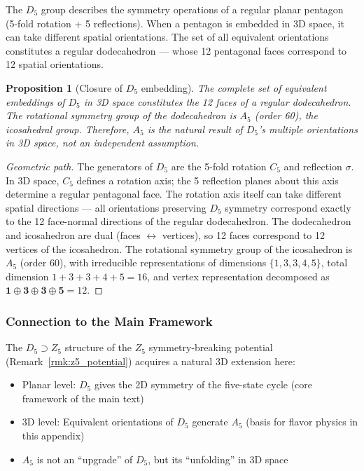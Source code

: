 \documentclass[12pt,a4paper,twocolumn]{article}
\newtheorem{proposition}[theorem]{Proposition}
\begin{document}
The $D_5$ group describes the symmetry operations of a regular planar pentagon (5-fold rotation + 5 reflections). When a pentagon is embedded in 3D space, it can take different spatial orientations. The set of all equivalent orientations constitutes a regular dodecahedron --- whose 12 pentagonal faces correspond to 12 spatial orientations.

\begin{proposition}[Closure of $D_5$ embedding]
\label{prop:d5_embed}
The complete set of equivalent embeddings of $D_5$ in 3D space constitutes the 12 faces of a regular dodecahedron. The rotational symmetry group of the dodecahedron is $A_5$ (order 60), the icosahedral group. Therefore, $A_5$ is the natural result of $D_5$'s multiple orientations in 3D space, not an independent assumption.
\end{proposition}

\begin{proof}[Geometric path]
The generators of $D_5$ are the 5-fold rotation $C_5$ and reflection $\sigma$. In 3D space, $C_5$ defines a rotation axis; the 5 reflection planes about this axis determine a regular pentagonal face. The rotation axis itself can take different spatial directions --- all orientations preserving $D_5$ symmetry correspond exactly to the 12 face-normal directions of the regular dodecahedron. The dodecahedron and icosahedron are dual (faces $\leftrightarrow$ vertices), so 12 faces correspond to 12 vertices of the icosahedron. The rotational symmetry group of the icosahedron is $A_5$ (order 60), with irreducible representations of dimensions $\{1,3,3,4,5\}$, total dimension $1+3+3+4+5=16$, and vertex representation decomposed as $\mathbf{1}\oplus\mathbf{3}\oplus\mathbf{3}\oplus\mathbf{5}=12$.
\end{proof}

\subsubsection{Connection to the Main Framework}

The $D_5 \supset Z_5$ structure of the $Z_5$ symmetry-breaking potential (Remark~\ref{rmk:z5_potential}) acquires a natural 3D extension here:

\begin{itemize}
\item Planar level: $D_5$ gives the 2D symmetry of the five-state cycle (core framework of the main text)
\item 3D level: Equivalent orientations of $D_5$ generate $A_5$ (basis for flavor physics in this appendix)
\item $A_5$ is not an ``upgrade'' of $D_5$, but its ``unfolding'' in 3D space
\end{itemize}
\end{document}
